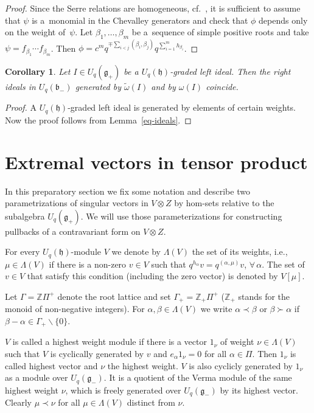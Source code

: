 \documentclass[pdftex]{sigma}
\numberwithin{equation}{section}
\newtheorem{Corollary}[Theorem]{Corollary}
\begin{document}
\begin{proof} Since the Serre relations are homogeneous, cf.~\cite{ChP}, it is sufficient to assume that $\psi$ is a~monomial in the Chevalley generators and check that $\phi$ depends only on the weight of~$\psi$. Let $\beta_1,\ldots, \beta_m$ be a~sequence of simple positive roots and take $\psi=f_{\beta_1}\cdots f_{\beta_{m}}$. Then $\phi=c^m q^{\mp \sum_{i<j}(\beta_i,\beta_j)}q^{\sum_{i=1}^{m}h_{\beta_i}}$.
\end{proof}
\begin{Corollary}\label{inv-ideals}Let $I\in U_q(\mathfrak{g}_+)$ be a $U_q(\mathfrak{h})$-graded left ideal. Then the right ideals in $U_q(\mathfrak{b}_-)$ generated by $\tilde \omega(I)$ and by $\omega(I)$ coincide.
\end{Corollary}
\begin{proof} A $U_q(\mathfrak{h})$-graded left ideal is generated by elements of certain weights. Now the proof follows from Lemma~\ref{eq-ideals}.
\end{proof}

\section{Extremal vectors in tensor product}
In this preparatory section we fix some notation and describe two parametrizations of singular vectors in $V\otimes Z$ by hom-sets relative to the subalgebra $U_q(\mathfrak{g}_+)$. We will use those parameterizations for constructing pullbacks of a contravariant form on $V\otimes Z$.

For every $U_q(\mathfrak{h})$-module $V$ we denote by $\Lambda(V)$ the set of its weights, i.e., $\mu\in \Lambda(V)$ if there is a non-zero $v\in V$ such that $q^{h_{\alpha}}v=q^{(\alpha,\mu)}v$, $\forall\, \alpha$. The set of $v\in V$ that satisfy this condition (including the zero vector) is denoted by $V[\mu]$.

Let $\Gamma=\mathbb{Z}\Pi^+$ denote the root lattice and set $\Gamma_+=\mathbb{Z}_+\Pi^+$ ($\mathbb{Z}_+$ stands for the monoid of non-negative integers). For $\alpha,\beta \in \Lambda(V)$ we write $\alpha\prec \beta$ or $\beta \succ \alpha$ if $\beta-\alpha \in \Gamma_+\backslash \{0\}$.

$V$ is called a highest weight module if there is a vector $1_\nu$ of weight $\nu\in \Lambda(V)$ such that $V$ is cyclically generated by $v$ and $e_\alpha 1_\nu=0$ for all $\alpha \in \Pi$. Then $1_\nu$ is called highest vector and $\nu$ the highest weight. $V$ is also cyclicly generated by $1_\nu$ as a module over $U_q(\mathfrak{g}_-)$. It is a quotient of the Verma module of the same highest weight $\nu$, which is freely generated over $U_q(\mathfrak{g}_-)$ by its highest vector. Clearly $\mu\prec \nu$ for all $\mu\in \Lambda(V)$ distinct from $\nu$.
\end{document}
